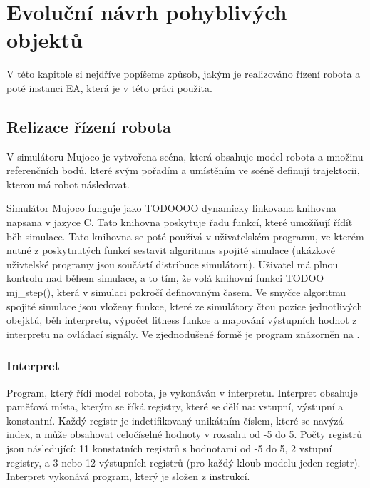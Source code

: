 \chapter{Evoluční návrh pohyblivých objektů}





V této kapitole si nejdříve popíšeme způsob, jakým je realizováno řízení robota a poté instanci EA, která je v této práci použita.
\section{Relizace řízení robota}
V simulátoru Mujoco je vytvořena scéna, která obsahuje model robota a množinu referenčních bodů, které svým pořadím a umístěním ve scéně definují trajektorii, kterou má robot následovat.

Simulátor Mujoco funguje jako TODOOOO dynamicky linkovana knihovna napsana v jazyce C.
Tato knihovna poskytuje řadu funkcí, které umožňují řídít běh simulace.
Tato knihovna se poté používá v uživatelském programu, ve kterém nutné z poskytnutých funkcí sestavit algoritmus spojité simulace (ukázkové uživtelské programy jsou součástí distribuce simulátoru).
Uživatel má plnou kontrolu nad během simulace, a to tím, že volá knihovní funkci TODOO mj\_step(), která v simulaci pokročí definovaným časem.
Ve smyčce algoritmu spojité simulace jsou vloženy funkce, které ze simulátory čtou pozice jednotlivých obejktů, běh interpretu, výpočet fitness funkce a mapování výstupních hodnot z interpretu na ovládací signály.
Ve zjednodušené formě je program znázorněn na .


\subsection{Interpret}

Program, který řídí model robota, je vykonáván v interpretu.
Interpret obsahuje paměťová místa, kterým se říká registry, které se dělí na: vstupní, výstupní a konstantní.
Každý registr je indetifikovaný unikátním číslem, které se navýzá index, a může obsahovat celočíselné hodnoty v rozsahu od -5 do 5.
Počty registrů jsou následující: 11 konstatních registrů s hodnotami od -5 do 5, 2 vstupní registry, a 3 nebo 12 výstupních registrů (pro každý kloub modelu jeden registr).
Interpret vykonává program, který je složen z instrukcí.

